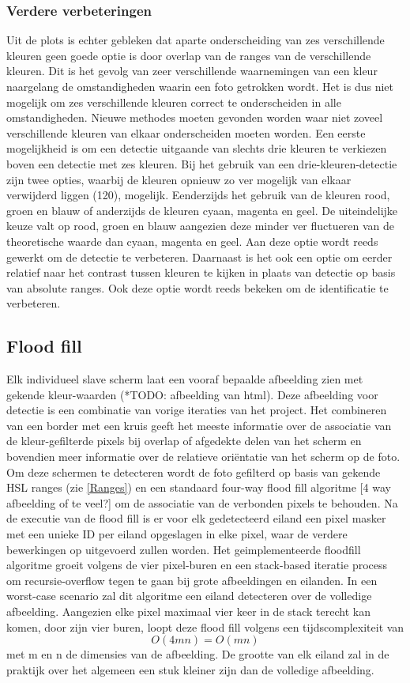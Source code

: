 \subsubsection{Verdere verbeteringen} \label{Verbeteringen kleur}
Uit de plots is echter gebleken dat aparte onderscheiding van zes verschillende kleuren geen goede optie is door overlap van de ranges van de verschillende kleuren. Dit is het gevolg van zeer verschillende waarnemingen van een kleur naargelang de omstandigheden waarin een foto getrokken wordt. Het is dus niet mogelijk om zes verschillende kleuren correct te onderscheiden in alle omstandigheden. Nieuwe methodes moeten gevonden worden waar niet zoveel verschillende kleuren van elkaar onderscheiden moeten worden. Een eerste mogelijkheid is om een detectie uitgaande van slechts drie kleuren te verkiezen boven een detectie met zes kleuren. Bij het gebruik van een drie-kleuren-detectie zijn twee opties, waarbij de kleuren opnieuw zo ver mogelijk van elkaar verwijderd liggen (120\degree),  mogelijk. Eenderzijds het gebruik van de kleuren rood, groen en blauw of anderzijds de kleuren cyaan, magenta en geel. De uiteindelijke keuze valt op rood, groen en blauw aangezien deze minder ver fluctueren van de theoretische waarde dan cyaan, magenta en geel. Aan deze optie wordt reeds gewerkt om de detectie te verbeteren. Daarnaast is het ook een optie om eerder relatief naar het contrast tussen kleuren te kijken in plaats van detectie op basis van absolute ranges. Ook deze optie wordt reeds bekeken om de identificatie te verbeteren.

\subsection{Flood fill}
Elk individueel slave scherm laat een vooraf bepaalde afbeelding zien met gekende kleur-waarden (*TODO: afbeelding van html). Deze afbeelding voor detectie is een combinatie van vorige iteraties van het project. Het combineren van een border met een kruis geeft het meeste informatie over de associatie van de kleur-gefilterde pixels bij overlap of afgedekte delen van het scherm en bovendien meer informatie over de relatieve oriëntatie van het scherm op de foto. Om deze schermen te detecteren wordt de foto gefilterd op basis van gekende HSL ranges (zie \ref{Ranges}) en een standaard four-way flood fill algoritme [4 way afbeelding of te veel?] \cite{floodfill} om de associatie van de verbonden pixels te behouden. Na de executie van de flood fill is er voor elk gedetecteerd eiland een pixel masker met een unieke ID per eiland opgeslagen in elke pixel, waar de verdere bewerkingen op uitgevoerd zullen worden. Het geimplementeerde floodfill algoritme groeit volgens de vier pixel-buren en een stack-based iteratie process om recursie-overflow tegen te gaan bij grote afbeeldingen en eilanden. In een worst-case scenario zal dit algoritme een eiland detecteren over de volledige afbeelding. Aangezien elke pixel maximaal vier keer in de stack terecht kan komen, door zijn vier buren, loopt deze flood fill volgens een tijdscomplexiteit van 
\[O(4mn)=O(mn)\]
 met m en n de dimensies van de afbeelding. De grootte van elk eiland zal in de praktijk over het algemeen een stuk kleiner zijn dan de volledige afbeelding.


